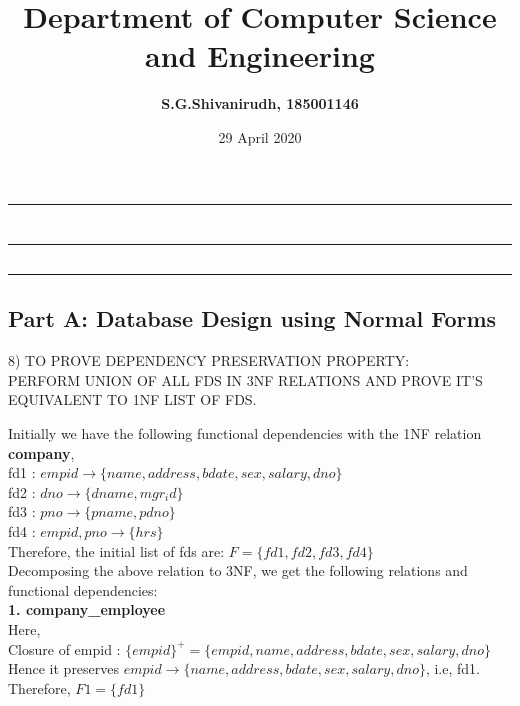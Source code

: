 \documentclass[12pt,letterpaper]{article}
\title{\textbf{Department of Computer Science and Engineering}}
\author{\textbf{S.G.Shivanirudh, 185001146}}
\date{29 April 2020}
\begin{document}
\maketitle

\hrule
\section*{}
\hrule 
\bigskip \bigskip

\subsection*{}
\hrule
\bigskip
\subsection*{Part A: Database Design using Normal Forms}
8) TO PROVE DEPENDENCY PRESERVATION PROPERTY:\\
   PERFORM UNION OF ALL FDS IN 3NF RELATIONS AND PROVE IT'S EQUIVALENT TO 1NF LIST OF FDS.\\
\bigskip

Initially we have the following functional dependencies with the 1NF relation \textbf{company},\\
fd1 : \(empid \rightarrow \{name, address, bdate, sex, salary, dno\}\)\\
fd2 : \(dno \rightarrow \{dname, mgr_id\}\)\\
fd3 : \(pno \rightarrow \{pname, pdno\}\)\\
fd4 : \(empid, pno \rightarrow \{hrs\}\)\\

Therefore, the initial list of fds are: \(F = \{fd1, fd2, fd3, fd4\}\)\\

Decomposing the above relation to 3NF, we get the following relations and functional dependencies:\\

\textbf{1. company\_employee}\\
Here,\\ 
Closure of empid : \(\{empid\}^{+} =  \{empid, name, address, bdate, sex, salary, dno\}\)\\
Hence it preserves \textbf{\(empid \rightarrow \{name, address, bdate, sex, salary, dno\}\)}, i.e, fd1.\\
Therefore,  \(F1 = \{ fd1 \}\)\\
\end{document}
